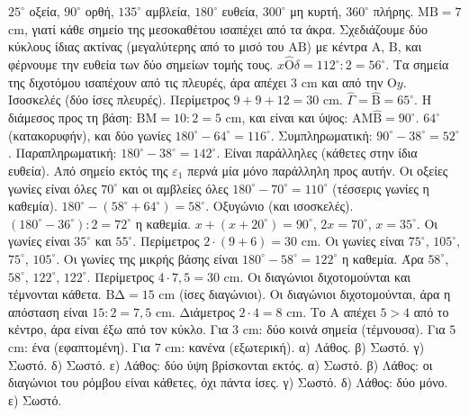  $25^\circ$ οξεία, $90^\circ$ ορθή, $135^\circ$ αμβλεία, $180^\circ$ ευθεία, $300^\circ$ μη κυρτή, $360^\circ$ πλήρης.
 $\mathrm{ΜΒ}=7$ cm, γιατί κάθε σημείο της μεσοκαθέτου ισαπέχει από τα άκρα. Σχεδιάζουμε δύο κύκλους ίδιας ακτίνας (μεγαλύτερης από το μισό του $\mathrm{ΑΒ}$) με κέντρα $\mathrm{Α}$, $\mathrm{Β}$, και φέρνουμε την ευθεία των δύο σημείων τομής τους.
 $x\hat{\mathrm{Ο}}\delta=112^\circ:2=56^\circ$. Τα σημεία της διχοτόμου ισαπέχουν από τις πλευρές, άρα απέχει $3$ cm και από την $\mathrm{Ο}y$.
 Ισοσκελές (δύο ίσες πλευρές). Περίμετρος $9+9+12=30$ cm.
 $\hat{\Gamma}=\hat{\mathrm{Β}}=65^\circ$. Η διάμεσος προς τη βάση: $\mathrm{ΒΜ}=10:2=5$ cm, και είναι και ύψος: $\mathrm{ΑΜ}\hat{\mathrm{Β}}=90^\circ$.
 $64^\circ$ (κατακορυφήν), και δύο γωνίες $180^\circ-64^\circ=116^\circ$.
 Συμπληρωματική: $90^\circ-38^\circ=52^\circ$. Παραπληρωματική: $180^\circ-38^\circ=142^\circ$.
 Είναι παράλληλες (κάθετες στην ίδια ευθεία). Από σημείο εκτός της $\varepsilon_1$ περνά μία μόνο παράλληλη προς αυτήν.
 Οι οξείες γωνίες είναι όλες $70^\circ$ και οι αμβλείες όλες $180^\circ-70^\circ=110^\circ$ (τέσσερις γωνίες η καθεμία).
 $180^\circ-(58^\circ+64^\circ)=58^\circ$. Οξυγώνιο (και ισοσκελές).
 $(180^\circ-36^\circ):2=72^\circ$ η καθεμία.
 $x+(x+20^\circ)=90^\circ$, $2x=70^\circ$, $x=35^\circ$. Οι γωνίες είναι $35^\circ$ και $55^\circ$.
 Περίμετρος $2\cdot(9+6)=30$ cm. Οι γωνίες είναι $75^\circ$, $105^\circ$, $75^\circ$, $105^\circ$.
 Οι γωνίες της μικρής βάσης είναι $180^\circ-58^\circ=122^\circ$ η καθεμία. Άρα $58^\circ$, $58^\circ$, $122^\circ$, $122^\circ$.
 Περίμετρος $4\cdot7{,}5=30$ cm. Οι διαγώνιοι διχοτομούνται και τέμνονται κάθετα.
 $\mathrm{ΒΔ}=15$ cm (ίσες διαγώνιοι). Οι διαγώνιοι διχοτομούνται, άρα η απόσταση είναι $15:2=7{,}5$ cm.
 Διάμετρος $2\cdot4=8$ cm. Το $\mathrm{Α}$ απέχει $5>4$ από το κέντρο, άρα είναι έξω από τον κύκλο.
 Για $3$ cm: δύο κοινά σημεία (τέμνουσα). Για $5$ cm: ένα (εφαπτομένη). Για $7$ cm: κανένα (εξωτερική).
 α) Λάθος. β) Σωστό. γ) Σωστό. δ) Σωστό. ε) Λάθος: δύο ύψη βρίσκονται εκτός.
 α) Σωστό. β) Λάθος: οι διαγώνιοι του ρόμβου είναι κάθετες, όχι πάντα ίσες. γ) Σωστό. δ) Λάθος: δύο μόνο. ε) Σωστό.
